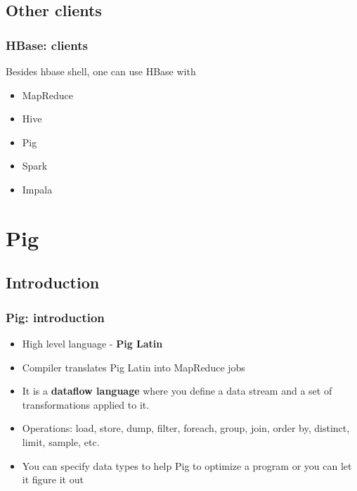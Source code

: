 \documentclass{beamer}
\begin{document}
\subsection{Other clients}
\begin{frame}
 \frametitle{HBase: clients}
 Besides hbase shell, one can use HBase with
 \begin{itemize}
  \item MapReduce
  \item Hive
  \item Pig
  \item Spark
  \item Impala
  \end{itemize}
\end{frame}


\section{Pig}
\subsection{Introduction}
\begin{frame}[fragile]
 \frametitle{Pig: introduction}
 \begin{itemize}
  \item High level language - {\color{mycolordef}\textbf{Pig Latin}}
  \item Compiler translates Pig Latin into MapReduce jobs
  \item It is a {\color{mycolordef}\textbf{dataflow language}} where you define a data stream and a set of transformations applied to it.
  \item Operations: load, store, dump, filter, foreach, group, join, order by, distinct, limit, sample, etc.
  \item You can specify data types to help Pig to optimize a program or you can let it figure it out
 \end{itemize}
\end{frame}
\end{document}
